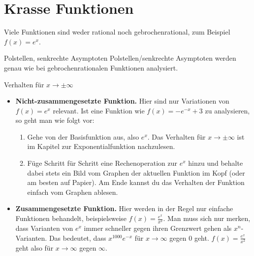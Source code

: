 \section{Krasse Funktionen}

Viele Funktionen sind weder rational noch gebrochenrational, zum Beispiel $f(x)=e^x$.

\begin{bla}{Polstellen, senkrechte Asymptoten}
  Polstellen/senkrechte Asymptoten werden genau wie bei gebrochenrationalen Funktionen analysiert.
\end{bla}

\begin{bla}{Verhalten für $x \rightarrow \pm \infty$}
  \begin{itemize}
    \item \textbf{Nicht-zusammengesetzte Funktion.} Hier sind nur Variationen von $f(x)=e^x$ relevant. Ist eine Funktion wie $f(x)=-e^{-x}+3$ zu analysieren, so geht man wie folgt vor:
    \begin{enumerate}
      \item Gehe von der Basisfunktion aus, also $e^x$. Das Verhalten für $x \rightarrow \pm \infty$ ist im Kapitel zur Exponentialfunktion nachzulesen.
      \item Füge Schritt für Schritt eine Rechenoperation zur $e^x$ hinzu und behalte dabei stets ein Bild vom Graphen der aktuellen Funktion im Kopf (oder am besten auf Papier). Am Ende kannst du das Verhalten der Funktion einfach vom Graphen ablesen.
    \end{enumerate}
    \item \textbf{Zusammengesetzte Funktion.} Hier werden in der Regel nur einfache Funktionen behandelt, beispielsweise $f(x)=\frac{e^x}{x^2}$. Man muss sich nur merken, dass Varianten von $e^x$ immer schneller gegen ihren Grenzwert gehen als $x^n$-Varianten. Das bedeutet, dass $x^{1000}e^{-x}$ für $x \rightarrow \infty$ gegen $0$ geht. $f(x)=\frac{e^x}{x^2}$ geht also für $x \rightarrow \infty$ gegen $\infty$.
  \end{itemize}
\end{bla}

\clearpage

